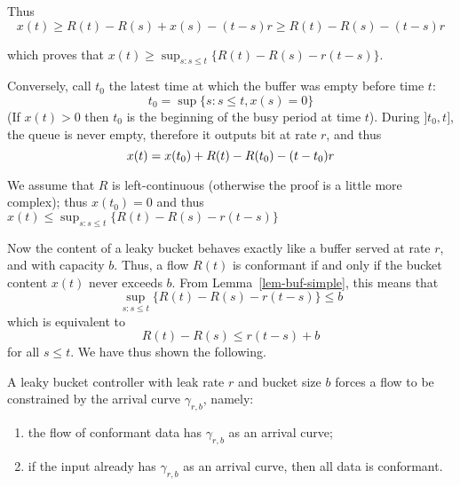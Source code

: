 Thus
$$
x(t) \geq R(t)-R(s) + x(s) - (t-s)r \geq R(t)-R(s) - (t-s)r
$$

which proves that $x(t) \geq \sup_{s : s \leq t} \{ R(t) - R(s) -r
(t-s)\}$.

Conversely, call $t_{0}$ the latest time at which the buffer was
empty before time $t$: $$t_{0} = \sup \{s: s\leq t, x(s) = 0\}$$
(If $x(t)  > 0$ then $t_{0}$ is the beginning of the busy period
at time $t$). During $]t_{0}, t]$, the queue is never empty,
therefore it outputs bit at rate $r$, and thus
\begin{equation} \mylabel{eq-d4-37443}
        x(t)=x(t_{0 })+R(t)-R(t_{0 }) - (t-t_{0 })r
\end{equation}

We assume that $R$ is left-continuous (otherwise the proof is a
little more complex); thus $x(t_{0 })=0$ and thus $x(t) \leq
\sup_{s : s \leq t} \{ R(t) - R(s) -r (t-s)\}$ %

Now the content of a leaky bucket behaves exactly like a buffer
served at rate $r$, and with capacity $b$. Thus, a flow $R(t)$ is
conformant if and only if the bucket content $x(t)$ never exceeds
$b$. From Lemma~\ref{lem-buf-simple}, this means that
$$
\sup_{s : s \leq t} \{ R(t) - R(s) -r (t-s)\} \leq b
$$
which is equivalent to
$$
R(t)-R(s) \leq r(t-s) +b
$$
for all $s \leq t$. We have thus shown the following.
\begin{proposition}
A leaky bucket controller with leak rate $r$ and bucket size $b$
forces a flow to be constrained by the arrival curve
$\gamma_{r,b}$, namely:
\begin{enumerate}
        \item  the flow of conformant data has $\gamma_{r,b}$ as an arrival
        curve;
\item  if the input already has $\gamma_{r,b}$ as an arrival
        curve, then all data is conformant.
\end{enumerate}
\end{proposition}
